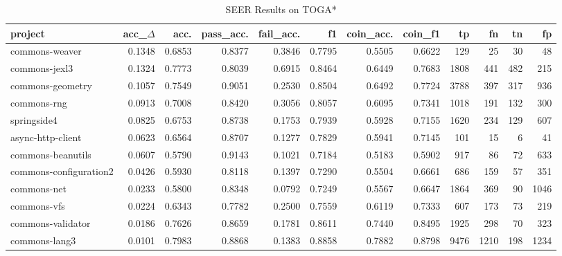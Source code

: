 \begin{table*}
\centering
\caption{SEER Results on TOGA*}
\label{tab:toga_results_all}
\begin{tabular}{lrrrrrrrrrrr}
\toprule
                project &  acc\_$\Delta$ &    acc. &  pass\_acc. &  fail\_acc. &      f1 &  coin\_acc. &  coin\_f1 &      tp &     fn &    tn &     fp \\
\midrule
         commons-weaver &      0.1348 &  0.6853 &     0.8377 &     0.3846 &  0.7795 &     0.5505 &   0.6622 &     129 &     25 &    30 &     48 \\
          commons-jexl3 &      0.1324 &  0.7773 &     0.8039 &     0.6915 &  0.8464 &     0.6449 &   0.7683 &    1808 &    441 &   482 &    215 \\
       commons-geometry &      0.1057 &  0.7549 &     0.9051 &     0.2530 &  0.8504 &     0.6492 &   0.7724 &    3788 &    397 &   317 &    936 \\
            commons-rng &      0.0913 &  0.7008 &     0.8420 &     0.3056 &  0.8057 &     0.6095 &   0.7341 &    1018 &    191 &   132 &    300 \\
            springside4 &      0.0825 &  0.6753 &     0.8738 &     0.1753 &  0.7939 &     0.5928 &   0.7155 &    1620 &    234 &   129 &    607 \\
      async-http-client &      0.0623 &  0.6564 &     0.8707 &     0.1277 &  0.7829 &     0.5941 &   0.7145 &     101 &     15 &     6 &     41 \\
      commons-beanutils &      0.0607 &  0.5790 &     0.9143 &     0.1021 &  0.7184 &     0.5183 &   0.5902 &     917 &     86 &    72 &    633 \\
 commons-configuration2 &      0.0426 &  0.5930 &     0.8118 &     0.1397 &  0.7290 &     0.5504 &   0.6661 &     686 &    159 &    57 &    351 \\
            commons-net &      0.0233 &  0.5800 &     0.8348 &     0.0792 &  0.7249 &     0.5567 &   0.6647 &    1864 &    369 &    90 &   1046 \\
            commons-vfs &      0.0224 &  0.6343 &     0.7782 &     0.2500 &  0.7559 &     0.6119 &   0.7333 &     607 &    173 &    73 &    219 \\
      commons-validator &      0.0186 &  0.7626 &     0.8659 &     0.1781 &  0.8611 &     0.7440 &   0.8495 &    1925 &    298 &    70 &    323 \\
          commons-lang3 &      0.0101 &  0.7983 &     0.8868 &     0.1383 &  0.8858 &     0.7882 &   0.8798 &    9476 &   1210 &   198 &   1234 \\

\end{tabular}
\end{table*}
